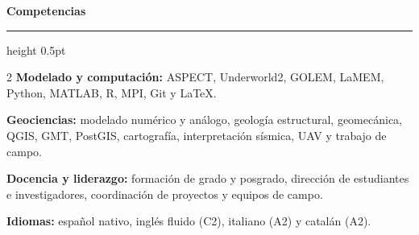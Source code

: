 \documentclass[10pt,a4paper]{../awesome-cv}
\makeatletter
\renewcommand*{\sectionstyle}[1]{{\fontsize{12.2pt}{14pt}\bodyfont\bfseries\color{text}\@sectioncolor #1}}
\renewcommand*{\descriptionstyle}[1]{{\fontsize{8.1pt}{9.8pt}\bodyfontlight\upshape\color{text} #1}}
\renewcommand{\cvsection}[1]{%
  \par\Needspace{3.3\baselineskip}%
  \addvspace{2.3mm}%
  \sectionstyle{#1}\par\nobreak%
  \vspace{0.1mm}%
  {\color{gray}\hrule height 0.5pt}%
  \vspace{0.55mm}%
}
\makeatother
\begin{document}
\cvsection{Competencias}
\begin{multicols}{2}
\descriptionstyle{\textbf{Modelado y computación:} ASPECT, Underworld2, GOLEM, LaMEM, Python, MATLAB, R, MPI, Git y \LaTeX.}\par
\descriptionstyle{\textbf{Geociencias:} modelado numérico y análogo, geología estructural, geomecánica, QGIS, GMT, PostGIS, cartografía, interpretación sísmica, UAV y trabajo de campo.}\par
\columnbreak
\descriptionstyle{\textbf{Docencia y liderazgo:} formación de grado y posgrado, dirección de estudiantes e investigadores, coordinación de proyectos y equipos de campo.}\par
\descriptionstyle{\textbf{Idiomas:} español nativo, inglés fluido (C2), italiano (A2) y catalán (A2).}\par
\end{multicols}
\end{document}
